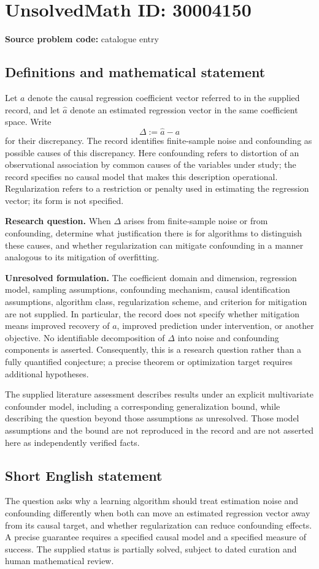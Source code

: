 \documentclass[11pt]{article}
\begin{document}
\section*{UnsolvedMath ID: 30004150}
\textbf{Source problem code:} catalogue entry
\subsection{Definitions and mathematical statement}
Let \(a\) denote the causal regression coefficient vector referred to in the supplied record, and let \(\hat a\) denote an estimated regression vector in the same coefficient space. Write
\[
\Delta:=\hat a-a
\]
for their discrepancy. The record identifies finite-sample noise and confounding as possible causes of this discrepancy. Here confounding refers to distortion of an observational association by common causes of the variables under study; the record specifies no causal model that makes this description operational. Regularization refers to a restriction or penalty used in estimating the regression vector; its form is not specified.

\textbf{Research question.} When \(\Delta\) arises from finite-sample noise or from confounding, determine what justification there is for algorithms to distinguish these causes, and whether regularization can mitigate confounding in a manner analogous to its mitigation of overfitting.

\textbf{Unresolved formulation.} The coefficient domain and dimension, regression model, sampling assumptions, confounding mechanism, causal identification assumptions, algorithm class, regularization scheme, and criterion for mitigation are not supplied. In particular, the record does not specify whether mitigation means improved recovery of \(a\), improved prediction under intervention, or another objective. No identifiable decomposition of \(\Delta\) into noise and confounding components is asserted. Consequently, this is a research question rather than a fully quantified conjecture; a precise theorem or optimization target requires additional hypotheses.

The supplied literature assessment describes results under an explicit multivariate confounder model, including a corresponding generalization bound, while describing the question beyond those assumptions as unresolved. Those model assumptions and the bound are not reproduced in the record and are not asserted here as independently verified facts.
\subsection{Short English statement}
The question asks why a learning algorithm should treat estimation noise and confounding differently when both can move an estimated regression vector away from its causal target, and whether regularization can reduce confounding effects. A precise guarantee requires a specified causal model and a specified measure of success. The supplied status is partially solved, subject to dated curation and human mathematical review.
\end{document}

